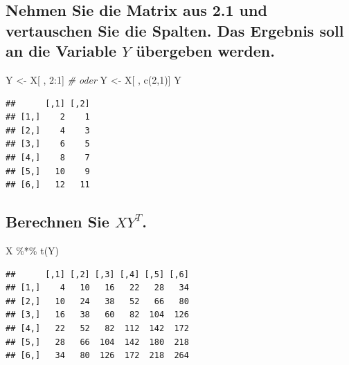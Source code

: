 \documentclass[12pt,a4paper]{article}
\newenvironment{Shaded}{\begin{snugshade}}{\end{snugshade}}
\newcommand{\CommentTok}[1]{\textcolor[rgb]{0.56,0.35,0.01}{\textit{#1}}}
\newcommand{\DecValTok}[1]{\textcolor[rgb]{0.00,0.00,0.81}{#1}}
\newcommand{\FunctionTok}[1]{\textcolor[rgb]{0.00,0.00,0.00}{#1}}
\newcommand{\NormalTok}[1]{#1}
\newcommand{\OtherTok}[1]{\textcolor[rgb]{0.56,0.35,0.01}{#1}}
\newcommand{\SpecialCharTok}[1]{\textcolor[rgb]{0.00,0.00,0.00}{#1}}
\begin{document}
\vspace{0.5cm}

\hypertarget{nehmen-sie-die-matrix-aus-2.1-und-vertauschen-sie-die-spalten.-das-ergebnis-soll-an-die-variable-y-uxfcbergeben-werden.}{%
\subsection{\texorpdfstring{Nehmen Sie die Matrix aus 2.1 und
vertauschen Sie die Spalten. Das Ergebnis soll an die Variable \(Y\)
übergeben
werden.}{Nehmen Sie die Matrix aus 2.1 und vertauschen Sie die Spalten. Das Ergebnis soll an die Variable Y übergeben werden.}}\label{nehmen-sie-die-matrix-aus-2.1-und-vertauschen-sie-die-spalten.-das-ergebnis-soll-an-die-variable-y-uxfcbergeben-werden.}}

\begin{Shaded}
\begin{Highlighting}[]
\NormalTok{    Y }\OtherTok{\textless{}{-}}\NormalTok{ X[ , }\DecValTok{2}\SpecialCharTok{:}\DecValTok{1}\NormalTok{] }\CommentTok{\# oder}
\NormalTok{    Y }\OtherTok{\textless{}{-}}\NormalTok{ X[ , }\FunctionTok{c}\NormalTok{(}\DecValTok{2}\NormalTok{,}\DecValTok{1}\NormalTok{)]}
\NormalTok{    Y}
\end{Highlighting}
\end{Shaded}

\begin{verbatim}
##      [,1] [,2]
## [1,]    2    1
## [2,]    4    3
## [3,]    6    5
## [4,]    8    7
## [5,]   10    9
## [6,]   12   11
\end{verbatim}

\vspace{0.5cm}

\hypertarget{berechnen-sie-xyt.}{%
\subsection{\texorpdfstring{Berechnen Sie
\(XY^{T}\).}{Berechnen Sie XY\^{}\{T\}.}}\label{berechnen-sie-xyt.}}

\begin{Shaded}
\begin{Highlighting}[]
\NormalTok{    X }\SpecialCharTok{\%*\%} \FunctionTok{t}\NormalTok{(Y)}
\end{Highlighting}
\end{Shaded}

\begin{verbatim}
##      [,1] [,2] [,3] [,4] [,5] [,6]
## [1,]    4   10   16   22   28   34
## [2,]   10   24   38   52   66   80
## [3,]   16   38   60   82  104  126
## [4,]   22   52   82  112  142  172
## [5,]   28   66  104  142  180  218
## [6,]   34   80  126  172  218  264
\end{verbatim}
\end{document}
